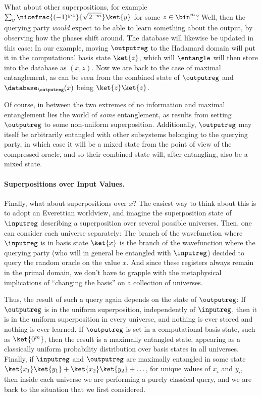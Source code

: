       What about other superpositions, for example $\sum_y \nicefrac{(-1)^{y
        \cdot z}}{\sqrt{2^{-m}}} \ket{y}$ for some $z \in \bin^m$? Well, then the querying party
        \emph{would} expect to be able to learn something about the output, by
        observing how the phases shift around. The database will likewise be
        updated in this case: In our example, moving $\outputreg$ to the Hadamard domain
        will put it in the computational basis state $\ket{z}$, which
        will $\entangle$ will then store into the database as $(x,z)$. Now we
        are back to the case of maximal entanglement, as can be seen from the
        combined state of $\outputreg$ and $\database_\outputreg(x)$ being
        $\ket{z}\ket{z}$.

      Of course, in between the two extremes of no information and maximal
        entanglement lies the world of \emph{some} entanglement, as
        results from setting $\outputreg$ to some non-uniform superposition.
        Additionally, $\outputreg$ may itself be arbitrarily entangled with
        other subsystems belonging to the querying party, in which case it will
        be a mixed state from the point of view of the compressed oracle, and
        so their combined state will, after entangling, also be a mixed state.

    \paragraph{Superpositions over Input Values.}
      Finally, what about superpositions over $x$? The easiest way to think
        about this is to adopt an Everettian worldview, and imagine the
        superposition state of $\inputreg$
        describing a superposition over several possible universes. Then, one can
        consider each universe separately: The branch of the wavefunction where
        $\inputreg$ is in basis state $\ket{x}$ is the branch of the
        wavefunction where the querying party (who will in general be entangled
        with $\inputreg$) decided to query the random oracle on the value $x$. 
        And since these registers always remain in the primal domain, we don't have
        to grapple with the metaphysical implications of ``changing the basis'' on a
        collection of universes.

      Thus, the result of such a query again depends on
        the state of $\outputreg$: If $\outputreg$ is in
        the uniform superposition, independently of $\inputreg$,
        then it is in the uniform superposition in every universe, and
        nothing is ever stored and nothing is ever learned. If
        $\outputreg$ is set in a computational basis state, such as
        $\ket{0^m}$, then the result is a maximally entangled state,
        appearing as a classically uniform probability distribution over basis
        states in all universes. Finally, if $\inputreg$ and $\outputreg$ are
        maximally entangled in some state $\ket{x_1}\ket{y_1} + \ket{x_2}\ket{y_2} +
        \ldots$, for unique values of $x_i$ and $y_i$, then
        inside each universe we are performing a purely classical query,
        and we are back to the situation that we first considered.


